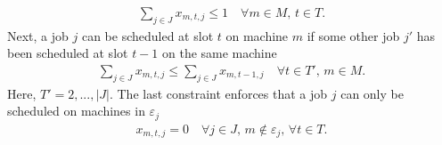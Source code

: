 \documentclass[12pt]{article}
\begin{document}
\begin{gather}
\sum_{j \in J} x_{m, t, j} \leq 1 \quad \forall m \in M, \, t\in T. \label{PAS-2}
\end{gather}
Next, a job $j$ can be scheduled at slot $t$ on machine $m$ if some other job $j'$ has been scheduled at slot $t-1$ on the same machine
\begin{gather}
\sum_{j \in J} x_{m,t,j} \leq  \sum_{j \in J} x_{m,t-1,j} \quad \forall t \in T', \, m \in M. \label{PAS-3}
\end{gather}
Here, $T' = {2, ..., |J|}$.
The last constraint enforces that a job $j$ can only be scheduled on machines in $\varepsilon_j$
\begin{gather}
x_{m,t,j} = 0 \quad \forall j \in J, \, m \not \in \varepsilon_j, \, \forall t \in T. \label{PAS-4}
\end{gather}
\end{document}
